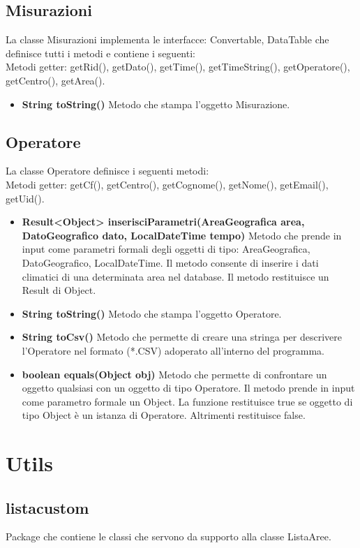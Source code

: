 \documentclass[a4paper, 12pt]{report}
\begin{document}
			\subsection{Misurazioni}
			La classe Misurazioni implementa le interfacce: Convertable, DataTable che definisce tutti i metodi e contiene i seguenti:\\
			Metodi getter: getRid(), getDato(), getTime(), getTimeString(), getOperatore(), getCentro(), getArea().
			\begin{itemize}
			\item \textbf{String toString()}
			Metodo che stampa l'oggetto Misurazione.
			\end{itemize}

			\subsection{Operatore}
			La classe Operatore definisce i seguenti metodi:\\
			Metodi getter: getCf(), getCentro(), getCognome(), getNome(), getEmail(), getUid().
			\begin{itemize}
			\item \textbf{Result<Object> inserisciParametri(AreaGeografica area, DatoGeografico dato, LocalDateTime tempo)}
			Metodo che prende in input come parametri formali degli oggetti di tipo: AreaGeografica, DatoGeografico, LocalDateTime.
			Il metodo consente di inserire i dati climatici di una determinata area nel database. Il metodo restituisce un Result di Object.
			\item \textbf{String toString()}
			Metodo che stampa l'oggetto Operatore.
			\item \textbf{String toCsv()}
			Metodo che permette di creare una stringa per descrivere l'Operatore nel formato (*.CSV) adoperato all'interno del programma.
			\item \textbf{boolean equals(Object obj)}
			Metodo che permette di confrontare un oggetto qualsiasi con un oggetto di tipo Operatore. Il metodo prende in input come parametro formale un Object. La funzione restituisce true se oggetto di tipo Object è un istanza di Operatore. Altrimenti restituisce false.
			\end{itemize}

		\section{Utils}
			\subsection{listacustom}
			Package che contiene le classi che servono da supporto alla classe ListaAree.
\end{document}
